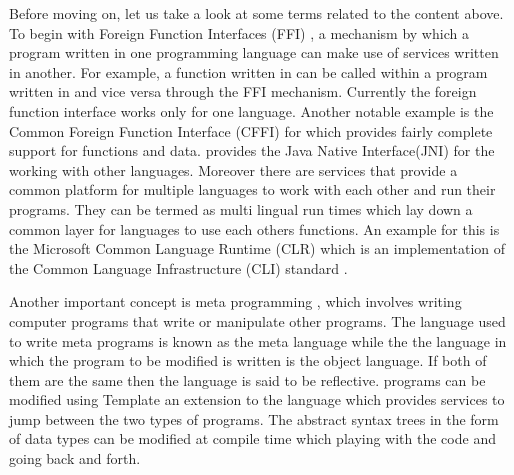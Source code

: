 \documentclass[thesis-solanki.tex]{subfiles}
\begin{document}
Before moving on, let us take a look at some terms related to the content above. To begin with Foreign 
Function Interfaces (FFI) \cite{website:ffiwiki}, a mechanism by which a program written in one programming 
language can make use of services written in another. For example, a function written in  can be 
called within a program written in  and vice versa through the FFI mechanism. Currently the 
 foreign function interface works only for one language. Another notable example is the 
Common Foreign Function Interface (CFFI) \cite{website:commonlisp} for  which provides fairly 
complete support for  functions and data.  provides the Java Native Interface(JNI) for 
the working with other languages. Moreover there are services that provide a common platform for multiple 
languages to work with each other and run their programs. They can be termed as multi lingual run times which lay 
down a common layer for languages to use each others functions. An example for this is the Microsoft Common 
Language Runtime (CLR) \cite{website:clrwiki} which is an implementation of the Common Language 
Infrastructure (CLI) standard \cite{website:cliwiki}.        

Another important concept is meta programming \cite{website:metaprogwiki}, which involves writing computer programs that write or manipulate 
other programs. The language used to write meta programs is known as the meta language while the the language in which the program to be modified is 
written is the object language. If both of them are the same then the language is said to be reflective.  programs can be modified using 
Template  \cite{website:templatehaskell} an extension to the language which provides services to jump between the two types of 
programs. The abstract syntax trees in the form of  data types can be modified at compile time which playing with the code and going 
back and forth.      
\end{document}
